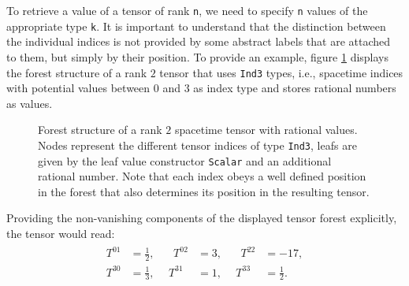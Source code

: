 To retrieve a value of a tensor of rank \texttt{n}, we need to specify \texttt{n} values of the appropriate type \texttt{k}. It is important to understand that the distinction between the individual indices is not provided by some abstract labels that are attached to them, but simply by their position. To provide an example, figure \ref{ExampleTens} displays the forest structure of a rank $2$ tensor that uses \texttt{Ind3} types, i.e., spacetime indices with potential values between $0$ and $3$ as index type and stores rational numbers as values.
\begin{figure}[hbt!]
\centering
{}
\caption[Forest Structure of a Rank $2$ Spacetime Tensor]{Forest structure of a rank $2$ spacetime tensor with rational values. Nodes represent the different tensor indices of type \texttt{Ind3}, leafs are given by the leaf value constructor \texttt{Scalar} and an additional rational number. Note that each index obeys a well defined position in the forest that also determines its position in the resulting tensor.}\label{ExampleTens}
\end{figure}
Providing the non-vanishing components of the displayed tensor forest explicitly, the tensor would read:
\begin{align}
\begin{alignedat}{3}
T^{01} &= \frac{1}{2}, \ \  &  \ \ T^{02} &= 3, \ \  & \ \ T^{22} &= -17,\\
T^{30} &= \frac{1}{3}, & T^{31} &= 1, & T^{33} &= \frac{1}{2}.
\end{alignedat}
\end{align}

